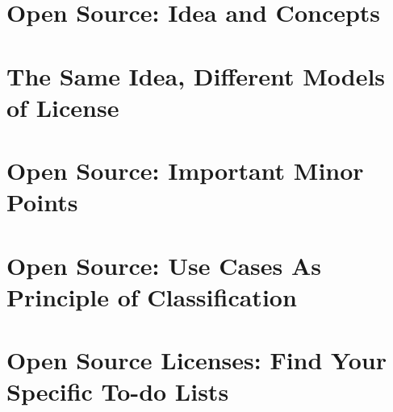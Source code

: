 \documentclass[DIV=calc,BCOR=5mm,12pt,headings=small,oneside,abstract=true,
toc=bib]{scrbook}
\begin{document}



%  


% 

% 
%

\chapter{Open Source: Idea and Concepts}






\chapter{The Same Idea, Different Models of License}



\chapter{Open Source: Important Minor Points}







\chapter{Open Source: Use Cases As Principle of Classification}



\chapter{Open Source Licenses: Find Your Specific To-do Lists}


\end{document}
